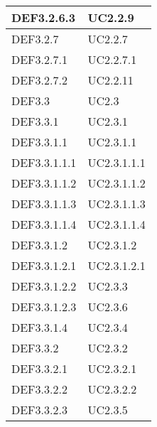 \documentclass{scalatekids-article}
\begin{document}
\begin{longtable}[H]{|p{5.5cm}|p{5.5cm}|}
\hline
DEF3.2.6.3 & \multiLineCell[t]{UC2.2.9\\}\\
\hline
DEF3.2.7 & \multiLineCell[t]{UC2.2.7\\}\\
\hline
DEF3.2.7.1 & \multiLineCell[t]{UC2.2.7.1\\}\\
\hline
DEF3.2.7.2 & \multiLineCell[t]{UC2.2.11\\}\\
\hline
DEF3.3 & \multiLineCell[t]{UC2.3\\}\\
\hline
DEF3.3.1 & \multiLineCell[t]{UC2.3.1\\}\\
\hline
DEF3.3.1.1 & \multiLineCell[t]{UC2.3.1.1\\}\\
\hline
DEF3.3.1.1.1 & \multiLineCell[t]{UC2.3.1.1.1\\}\\
\hline
DEF3.3.1.1.2 & \multiLineCell[t]{UC2.3.1.1.2\\}\\
\hline
DEF3.3.1.1.3 & \multiLineCell[t]{UC2.3.1.1.3\\}\\
\hline
DEF3.3.1.1.4 & \multiLineCell[t]{UC2.3.1.1.4\\}\\
\hline
DEF3.3.1.2 & \multiLineCell[t]{UC2.3.1.2\\}\\
\hline
DEF3.3.1.2.1 & \multiLineCell[t]{UC2.3.1.2.1\\}\\
\hline
DEF3.3.1.2.2 & \multiLineCell[t]{UC2.3.3\\}\\
\hline
DEF3.3.1.2.3 & \multiLineCell[t]{UC2.3.6\\}\\
\hline
DEF3.3.1.4 & \multiLineCell[t]{UC2.3.4\\}\\
\hline
DEF3.3.2 & \multiLineCell[t]{UC2.3.2\\}\\
\hline
DEF3.3.2.1 & \multiLineCell[t]{UC2.3.2.1\\}\\
\hline
DEF3.3.2.2 & \multiLineCell[t]{UC2.3.2.2\\}\\
\hline
DEF3.3.2.3 & \multiLineCell[t]{UC2.3.5\\}\\

\end{longtable}
\end{document}

